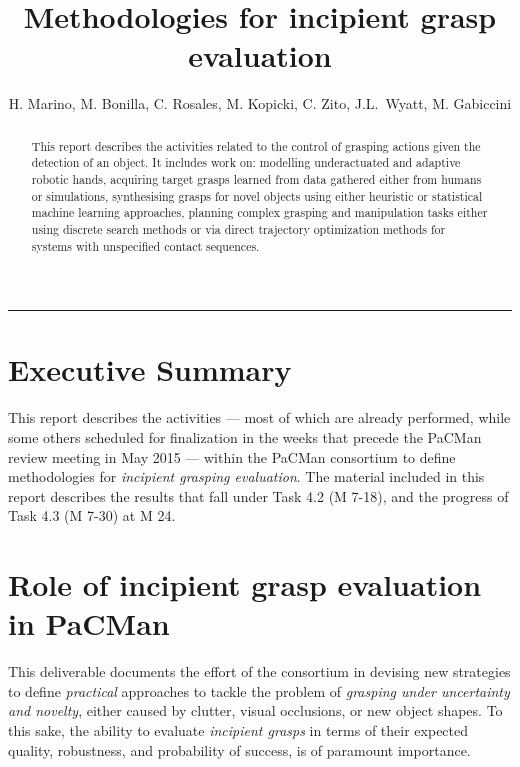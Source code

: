 \documentclass[a4paper,11pt,pdf]{pacmanreport}
\title{Methodologies for incipient grasp evaluation}
\author{H. Marino, M. Bonilla, C. Rosales, M. Kopicki, C. Zito, J.L.~Wyatt, M. Gabiccini}
\begin{document}
\maketitle

\begin{abstract}
\noindent This report describes the activities related to the control of grasping actions given the detection of an object. It includes work on: modelling underactuated and adaptive robotic hands, acquiring target grasps learned from data gathered either from humans or simulations, synthesising grasps for novel objects using either heuristic or statistical machine learning approaches, planning complex grasping and manipulation tasks either using discrete search methods or via direct trajectory optimization methods for systems with unspecified contact sequences.
\end{abstract}


\vspace{.2em}
\hrule

\footnotesize

\tableofcontents

\normalsize

\newpage

\section*{Executive Summary}

This report describes the activities --- most of which are already performed, while some others scheduled for finalization in the weeks that precede the PaCMan review meeting in May 2015 --- within the PaCMan consortium to define methodologies for \emph{incipient grasping evaluation}. The material included in this report describes the results that fall under Task 4.2 (M 7-18), and the progress of Task 4.3 (M 7-30) at M 24.

\section*{Role of incipient grasp evaluation in PaCMan}

This deliverable documents the effort of the consortium in devising new strategies to define \emph{practical} approaches to tackle the problem of \emph{grasping under uncertainty and novelty}, either caused by clutter, visual occlusions, or new object shapes. To this sake, the ability to evaluate \emph{incipient grasps} in terms of their expected quality, robustness, and probability of success, is of paramount importance.
\end{document}
